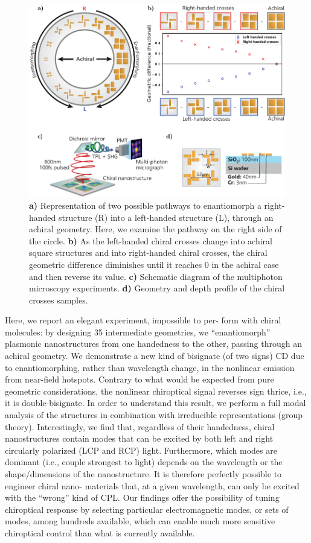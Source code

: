 \begin{figure}[htb!]	
    \centering	
    \includegraphics[scale=1]{./figures/results/EnantiomorphingChiralCrosses/setup.pdf}
    \caption{\label{fig:results:EnantiomorphingChiralCrosses:setup}
    \textbf{a)} Representation of two possible pathways to enantiomorph a right-handed structure (R) into a left-handed structure (L), through an achiral geometry. Here, we examine the pathway on the right side of the circle. \textbf{b)} As the left-handed chiral crosses change into achiral square structures and into right-handed chiral crosses, the chiral geometric difference diminishes until it reaches 0 in the achiral case and then reverse its value. \textbf{c)} Schematic diagram of the multiphoton microscopy experiments. \textbf{d)} Geometry and depth profile of the chiral crosses samples.}	
\end{figure}

Here, we report an elegant experiment, impossible to per-
form with chiral molecules: by designing 35 intermediate geometries, we ``enantiomorph'' plasmonic nanostructures from one handedness to the other, passing through an achiral geometry. 
We demonstrate a new kind of bisignate (of two signs) CD due to enantiomorphing, rather than wavelength change, in the nonlinear emission from near-field hotspots. Contrary to what would be expected from pure geometric considerations, the nonlinear chiroptical signal reverses sign thrice, i.e., it is double-bisignate. In order to understand this result, we perform a full modal analysis of the structures in combination with irreducible representations (group theory). 
Interestingly, we find that, regardless of their handedness, chiral nanostructures contain modes that can be excited by both left and right circularly polarized (LCP and RCP) light. Furthermore, which modes are dominant (i.e., couple strongest to light) depends on the wavelength or the shape/dimensions of the nanostructure. It is therefore perfectly possible to engineer chiral nano- materials that, at a given wavelength, can only be excited with the “wrong” kind of CPL. 
Our findings offer the possibility of tuning chiroptical response by selecting particular electromagnetic modes, or sets of modes, among hundreds available, which can enable much more sensitive chiroptical control than what is currently available.

